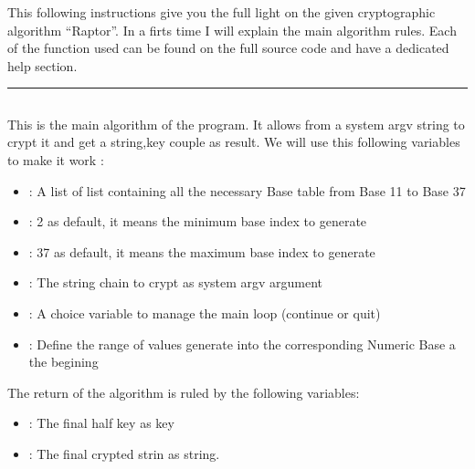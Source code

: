 \documentclass[letterpaper,10pt,english]{sphinxmanual}
\begin{document}
\sphinxAtStartPar
This following instructions give you the full light on the given cryptographic algorithm “Raptor”.
In a firts time I will explain the main algorithm rules. Each of the function used can be found on the
full source code and have a dedicated help section.

\sphinxAtStartPar
{}


\bigskip\hrule\bigskip



\subsection{}
\label{\detokenize{Description of Crypterv2:algorithm}}
\sphinxAtStartPar
This is the main algorithm of the program.
It allows from a system argv string to crypt it and get a string,key couple as result.
We will use this following variables to make it work :
\begin{itemize}
\item {} 
\sphinxAtStartPar
{} : A list of list containing all the necessary Base table from Base 11 to Base 37

\item {} 
\sphinxAtStartPar
{} : 2 as default, it means the minimum base index to generate

\item {} 
\sphinxAtStartPar
{} :  37 as default, it means the maximum base index to generate

\item {} 
\sphinxAtStartPar
{} : The string chain to crypt as system argv argument

\item {} 
\sphinxAtStartPar
{} : A choice variable to manage the main loop (continue or quit)

\item {} 
\sphinxAtStartPar
{} : Define the range of values generate into the corresponding Numeric Base a the begining

\end{itemize}

\sphinxAtStartPar
The return of the algorithm is ruled by the following variables:
\begin{itemize}
\item {} 
\sphinxAtStartPar
{} : The final half key as key

\item {} 
\sphinxAtStartPar
{} : The final crypted strin as string.

\end{itemize}
\end{document}
